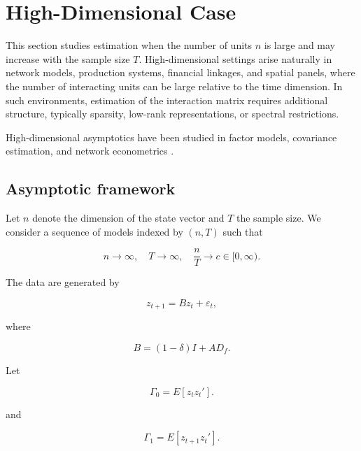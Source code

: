 \documentclass[12pt]{article}
\numberwithin{equation}{section}
\begin{document}
\section{High-Dimensional Case}

This section studies estimation when the number of units $n$ is large and may
increase with the sample size $T$. High-dimensional settings arise naturally in
network models, production systems, financial linkages, and spatial panels,
where the number of interacting units can be large relative to the time
dimension. In such environments, estimation of the interaction matrix requires
additional structure, typically sparsity, low-rank representations, or
spectral restrictions.

High-dimensional asymptotics have been studied in factor models, covariance
estimation, and network econometrics
\citep{bai2003inferential, bai2009panel, fan2016overview,
chandrasekhar2016econometrics, graham2017econometrics}.

\subsection{Asymptotic framework}

Let $n$ denote the dimension of the state vector and $T$ the sample size.
We consider a sequence of models indexed by $(n,T)$ such that

\begin{equation}
n \to \infty,
\quad
T \to \infty,
\quad
\frac{n}{T} \to c \in [0,\infty).
\label{eq:6.asymptotics}
\end{equation}

The data are generated by

\begin{equation}
z_{t+1}
=
B z_t
+
\varepsilon_t,
\label{eq:6.model}
\end{equation}

where

\begin{equation}
B
=
(1-\delta) I
+
A D_f.
\label{eq:6.operator}
\end{equation}

Let

\begin{equation}
\Gamma_0
=
E[z_t z_t'].
\label{eq:6.gamma0}
\end{equation}

and

\begin{equation}
\Gamma_1
=
E[z_{t+1} z_t'].
\label{eq:6.gamma1}
\end{equation}
\end{document}
